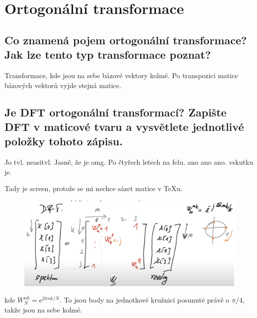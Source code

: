 \documentclass[a4paper,12pt]{article}   %
\newcommand{\mt}[1]{$#1$}
\newcommand{\e}{\text{e}}
\begin{document}
\newpage \section{Ortogonální transformace}
\subsection{Co znamená pojem ortogonální transformace? Jak lze tento typ transformace poznat?}
Transformace, kde jsou na sebe bázové vektory kolmé.
Po transpozici matice bázových vektorů vyjde stejná matice. 


\subsection{Je DFT ortogonální transformací? Zapište DFT v maticové tvaru a vysvětlete jednotlivé položky tohoto zápisu.}
Jo tvl. neasitvl. Jasně, že je omg. Po čtyřech letech na felu. ano ano ano. vskutku je.

Tady je screen, protože se mi nechce sázet matice v TeXu.
\begin{figure}[h!]
        \centering
        \includegraphics[width=.6\textwidth]{fig/DFT_matrix.png}
\end{figure}
kde \mt{W_N^{nk} = \e^{2\pi n k/N}}. To jsou body na jednotkové kružnici posunuté právě o \mt{\pi/4}, takže jsou na sebe kolmé. 

\begin{center}
        \Ladiesroom~~\Ladiesroom~~\Ladiesroom~~\Ladiesroom~~\Ladiesroom~~\Ladiesroom~~\Ladiesroom~~\Ladiesroom~~\Ladiesroom~~\Ladiesroom~~\Ladiesroom~~\Ladiesroom~~\Ladiesroom~~\Ladiesroom~~\Ladiesroom~~\Ladiesroom~~\Ladiesroom~~\Ladiesroom~~\Ladiesroom~~\Ladiesroom~~\Ladiesroom~~\Ladiesroom~~\Ladiesroom~~\Ladiesroom~~\Ladiesroom~~\Ladiesroom~~\Ladiesroom~~\Ladiesroom~~\Ladiesroom~~\Ladiesroom~~\Ladiesroom~~\Ladiesroom~~\Ladiesroom~~\Ladiesroom~~\Ladiesroom~~\Ladiesroom~~\Ladiesroom~~\Ladiesroom~~\Ladiesroom~~\Ladiesroom~~\Ladiesroom~~\Ladiesroom~~\Ladiesroom~~\Ladiesroom~~\Ladiesroom
\end{center}
        \FloatBarrier
\end{document}
